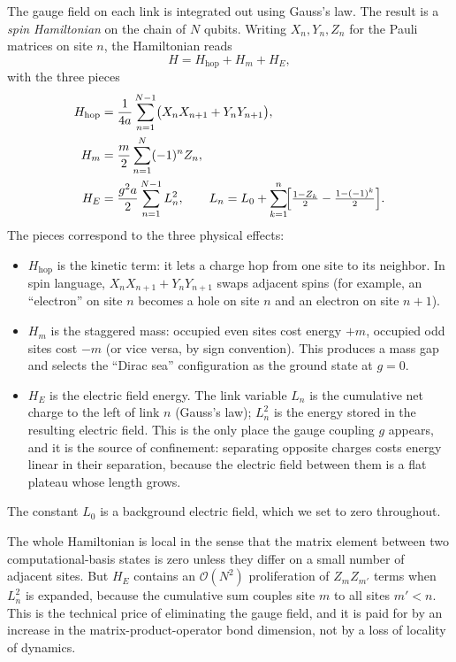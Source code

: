 \documentclass[11pt,a4paper]{article}
\theoremstyle{definition}
\theoremstyle{plain}
\theoremstyle{remark}
\begin{document}
The gauge field on each link is integrated out using Gauss's law.
The result is a \emph{spin Hamiltonian} on the chain of $N$ qubits.
Writing $X_n, Y_n, Z_n$ for the Pauli matrices on site $n$, the
Hamiltonian reads
\begin{equation}\label{eq:H}
  H = H_{\mathrm{hop}} + H_m + H_E,
\end{equation}
with the three pieces
\begin{align}
  H_{\mathrm{hop}} &= \frac{1}{4a} \sum_{n=1}^{N-1}
    \bigl( X_n X_{n+1} + Y_n Y_{n+1} \bigr), \label{eq:Hhop}\\
  H_m &= \frac{m}{2} \sum_{n=1}^{N} (-1)^n Z_n, \label{eq:Hm}\\
  H_E &= \frac{g^2 a}{2} \sum_{n=1}^{N-1} L_n^2, \qquad
        L_n = L_0 + \sum_{k=1}^{n}\!\Bigl[\tfrac{1-Z_k}{2} - \tfrac{1-(-1)^k}{2}\Bigr]. \label{eq:HE}
\end{align}
The pieces correspond to the three physical effects:
\begin{itemize}[nosep]
  \item $H_{\mathrm{hop}}$ is the kinetic term: it lets a charge hop
        from one site to its neighbor.  In spin language, $X_n X_{n+1}
        + Y_n Y_{n+1}$ swaps adjacent spins (for example, an
        ``electron'' on site $n$ becomes a hole on site $n$ and an
        electron on site $n+1$).
  \item $H_m$ is the staggered mass: occupied even sites cost energy
        $+m$, occupied odd sites cost $-m$ (or vice versa, by sign
        convention).  This produces a mass gap and selects the
        ``Dirac sea'' configuration as the ground state at $g = 0$.
  \item $H_E$ is the electric field energy.  The link variable $L_n$ is
        the cumulative net charge to the left of link $n$ (Gauss's
        law); $L_n^2$ is the energy stored in the resulting electric
        field.  This is the only place the gauge coupling $g$
        appears, and it is the source of confinement: separating
        opposite charges costs energy linear in their separation,
        because the electric field between them is a flat plateau
        whose length grows.
\end{itemize}
The constant $L_0$ is a background electric field, which we set to
zero throughout.

The whole Hamiltonian is local in the sense that the matrix element
between two computational-basis states is zero unless they differ on
a small number of adjacent sites.  But $H_E$ contains an
$\mathcal{O}(N^2)$ proliferation of $Z_m Z_{m'}$ terms when $L_n^2$
is expanded, because the cumulative sum couples site $m$ to all
sites $m' < n$.  This is the technical price of eliminating the
gauge field, and it is paid for by an increase in the
matrix-product-operator bond dimension, not by a loss of locality of
dynamics.
\end{document}
